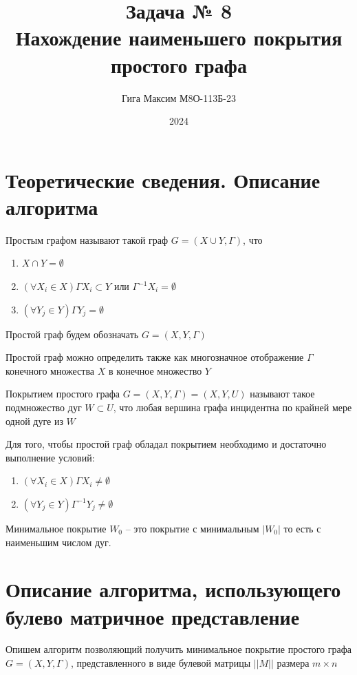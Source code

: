 \documentclass[12pt]{article}
\title{Задача № 8 \\ 
Нахождение наименьшего покрытия простого графа}
\author{Гига Максим М8О-113Б-23}
\date{2024}
\begin{document}
\maketitle

\section{Теоретические сведения. Описание алгоритма}

Простым графом называют такой граф $G = (X \cup Y, \Gamma)$, что
\begin{enumerate}
    \item $X \cap Y = \emptyset$
    \item $(\forall X_i \in X) \Gamma X_i \subset Y$
          или $\Gamma^{-1} X_i = \emptyset$
    \item $(\forall Y_j \in Y) \Gamma Y_j = \emptyset$
\end{enumerate}

Простой граф будем обозначать $G = (X, Y, \Gamma)$

Простой граф можно определить также как многозначное
отображение $\Gamma$ конечного множества $X$ в конечное
множество $Y$

Покрытием простого графа $G = (X, Y, \Gamma) = (X, Y, U)$ называют
такое подмножество дуг $W \subset U$, что любая вершина графа
инцидентна по крайней мере одной дуге из $W$

Для того, чтобы простой граф обладал покрытием необходимо и достаточно
выполнение условий:
\begin{enumerate}
    \item $(\forall X_i \in X) \Gamma X_i \ne \emptyset$
    \item $(\forall Y_j \in Y) \Gamma^{-1} Y_j \ne \emptyset$
\end{enumerate}

Минимальное покрытие $W_0$ – это покрытие с минимальным $|W_0|$
то есть с наименьшим числом дуг.

\section{Описание алгоритма, использующего булево
  матричное представление}

Опишем алгоритм позволяющий получить минимальное покрытие
простого графа \\ $G = (X, Y, \Gamma)$, представленного
в виде булевой матрицы $||M||$ размера $m \times n$
\end{document}
